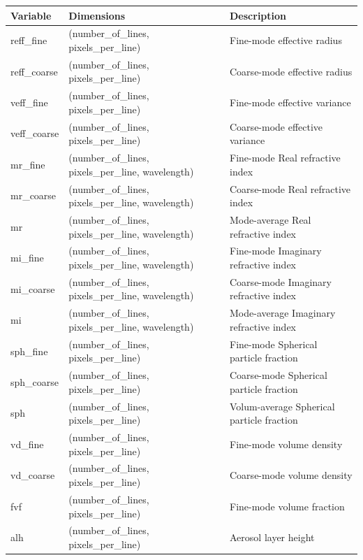 \documentclass[
  11pt,
  letterpaper,
  DIV=11,
  numbers=noendperiod]{scrreprt}
\begin{document}
\begin{longtable}[]{@{}
  >{\raggedright\arraybackslash}p{}
  >{\raggedright\arraybackslash}p{}
  >{\raggedright\arraybackslash}p{}@{}}
\toprule\noalign{}
\begin{minipage}[b]{\linewidth}\raggedright
Variable
\end{minipage} & \begin{minipage}[b]{\linewidth}\raggedright
Dimensions
\end{minipage} & \begin{minipage}[b]{\linewidth}\raggedright
Description
\end{minipage} \\
\midrule\noalign{}
\endhead
\bottomrule\noalign{}
\endlastfoot
reff\_fine & (number\_of\_lines, pixels\_per\_line) & Fine-mode
effective radius \\
reff\_coarse & (number\_of\_lines, pixels\_per\_line) & Coarse-mode
effective radius \\
veff\_fine & (number\_of\_lines, pixels\_per\_line) & Fine-mode
effective variance \\
veff\_coarse & (number\_of\_lines, pixels\_per\_line) & Coarse-mode
effective variance \\
mr\_fine & (number\_of\_lines, pixels\_per\_line, wavelength) &
Fine-mode Real refractive index \\
mr\_coarse & (number\_of\_lines, pixels\_per\_line, wavelength) &
Coarse-mode Real refractive index \\
mr & (number\_of\_lines, pixels\_per\_line, wavelength) & Mode-average
Real refractive index \\
mi\_fine & (number\_of\_lines, pixels\_per\_line, wavelength) &
Fine-mode Imaginary refractive index \\
mi\_coarse & (number\_of\_lines, pixels\_per\_line, wavelength) &
Coarse-mode Imaginary refractive index \\
mi & (number\_of\_lines, pixels\_per\_line, wavelength) & Mode-average
Imaginary refractive index \\
sph\_fine & (number\_of\_lines, pixels\_per\_line) & Fine-mode Spherical
particle fraction \\
sph\_coarse & (number\_of\_lines, pixels\_per\_line) & Coarse-mode
Spherical particle fraction \\
sph & (number\_of\_lines, pixels\_per\_line) & Volum-average Spherical
particle fraction \\
vd\_fine & (number\_of\_lines, pixels\_per\_line) & Fine-mode volume
density \\
vd\_coarse & (number\_of\_lines, pixels\_per\_line) & Coarse-mode volume
density \\
fvf & (number\_of\_lines, pixels\_per\_line) & Fine-mode volume
fraction \\
alh & (number\_of\_lines, pixels\_per\_line) & Aerosol layer height \\
\end{longtable}
\end{document}
